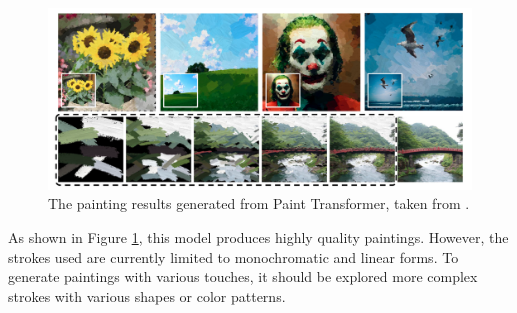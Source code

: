 \vspace{0.7cm}

\begin{figure}[h]
    \centering
    \includegraphics[width=150truemm]{resources/3_related_work/PTresult.png}
    \caption{
        The painting results generated from Paint Transformer,
        taken from \cite{liu2021paint}.
    }
    \label{PTresult}
\end{figure}
As shown in Figure \ref{PTresult}, this model produces highly quality paintings.
However, the strokes used are currently limited to monochromatic and linear forms.
To generate paintings with various touches, it should be explored more complex 
strokes with various shapes or color patterns.

